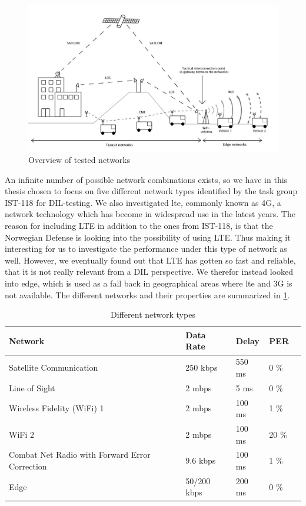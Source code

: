 \begin{figure}[h]
\includegraphics[scale=0.25]{images/networks_overview.pdf}
\caption{Overview of tested networks}
\label{figure-networks-overview}
\end{figure}

An infinite number of possible network combinations exists, so we have in this
thesis chosen to focus on five different network types identified by the task
group IST-118 for DIL-testing. We also investigated \gls{lte}, commonly known as
4G, a network technology which has become in widespread use in the latest years.
The reason for including LTE in addition to the ones from IST-118, is that the
Norwegian Defense is looking into the possibility of using LTE. Thus making it
interesting for us to investigate the performance under this type of network as
well. However, we eventually found out that LTE has gotten so fast and reliable,
that it is not really relevant from a DIL perspective. We therefor instead
looked into \gls{edge}, which is used as a fall back in geographical areas where
\gls{lte} and 3G is not available. The different networks and their properties
are summarized in \cref{table-network-types}.

\begin{table}[h]
\begin{tabular}{| l | l | l | l | l |}
\hline
  \textbf{Network} & \textbf{Data Rate} & \textbf{Delay} & \textbf{PER} \\ \hline
  Satellite Communication & 250 kbps & 550 ms & 0 \% \\ \hline
  Line of Sight & 2 mbps & 5 ms & 0 \% \\ \hline
  Wireless Fidelity (WiFi) 1 & 2 mbps & 100 ms & 1 \% \\ \hline
  WiFi 2 & 2 mbps & 100 ms & 20 \% \\ \hline
  Combat Net Radio with Forward Error Correction & 9.6 kbps & 100 ms & 1 \% \\ \hline
  Edge & 50/200 kbps & 200 ms & 0 \% \\ \hline
\end{tabular}
\caption{Different network types}
\label{table-network-types}
\end{table}


